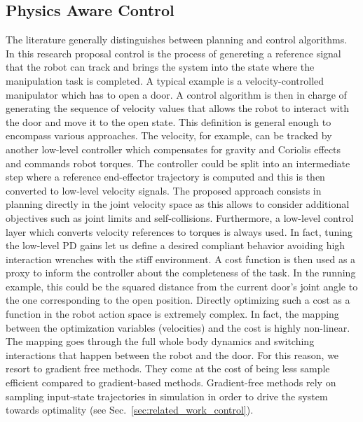 \subsection{Physics Aware Control}
The literature generally distinguishes between planning and control algorithms. In this research proposal control is the process of genereting a reference signal that the robot can track and brings the system into the state where the manipulation task is completed. A typical example is a velocity-controlled manipulator which has to open a door. A control algorithm is then in charge of generating the sequence of velocity values that allows the robot to interact with the door and move it to the open state. This definition is general enough to encompass various approaches. The velocity, for example, can be tracked by another low-level controller which compensates for gravity and Coriolis effects and commands robot torques. The controller could be split into an intermediate step where a reference end-effector trajectory is computed and this is then converted to low-level velocity signals. The proposed approach consists in planning directly in the joint velocity space as this allows to consider additional objectives such as joint limits and self-collisions. Furthermore, a low-level control layer which converts velocity references to torques is always used. In fact, tuning the low-level PD gains let us define a desired compliant behavior avoiding high interaction wrenches with the stiff environment. 
A cost function is then used as a proxy to inform the controller about the completeness of the task. In the running example, this could be the squared distance from the current door's joint angle to the one corresponding to the open position. 
Directly optimizing such a cost as a function in the robot action space is extremely complex. In fact, the mapping between the optimization variables (velocities) and the cost is highly non-linear. The mapping goes through the full whole body dynamics and switching interactions that happen between the robot and the door. For this reason, we resort to gradient free methods. They come at the cost of being less sample efficient compared to gradient-based methods. Gradient-free methods rely on sampling input-state trajectories in simulation in order to drive the system towards optimality (see Sec.~\ref{sec:related_work_control}).

